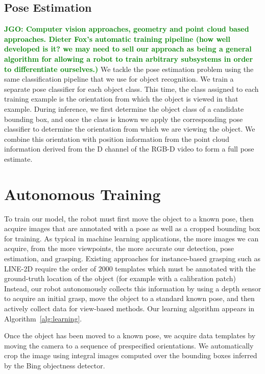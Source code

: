 \documentclass[conference]{IEEEtran}
\newcommand{\jgonote}[1]{\textcolor{green}{\textbf{JGO: #1}}}
\begin{document}
 
\subsection{Pose Estimation}
\jgonote{Computer vision approaches, geometry and point cloud based approaches. Dieter Fox's automatic
training pipeline (how well developed is it? we may need to sell our approach as being a 
general algorithm for allowing a robot to train arbitrary subsystems in order to differentiate 
ourselves.)}
We tackle the pose estimation problem using the same classification pipeline that we use for
object recognition. We train a separate pose classifier for each object class. This time, the class
assigned to each training example is the orientation from which the object is viewed in that example.
During inference, we first determine the object class of a candidate bounding box, and once the class
is known we apply the corresponding pose classifier to determine the orientation from which we
are viewing the object. We combine this orientation with position information from the point cloud
information derived from the D channel of the RGB-D video to form a full pose estimate.

\section{Autonomous Training}
\label{sec:training}

To train our model, the robot must first move the object to a known
pose, then acquire images that are annotated with a pose as well as a
cropped bounding box for training.  As typical in machine learning
applications, the more images we can acquire, from the more
viewpoints, the more accurate our detection, pose estimation, and
grasping.  Existing approaches for instance-based grasping such as
LINE-2D require the order of $2000$ templates which must be annotated
with the ground-truth location of the object (for example with a
calibration patch)~\citep{hinterstoisser12} Instead, our robot
autonomously collects this information by using a depth sensor to
acquire an initial grasp, move the object to a standard known pose,
and then actively collect data for view-based methods.  Our learning
algorithm appears in Algorithm~\ref{alg:learning}.

Once the object has been moved to a known pose, we acquire data
templates by moving the camera to a sequence of prespecified
orientations.  We automatically crop the image using integral images
computed over the bounding boxes inferred by the Bing objectness
detector. 
\end{document}
